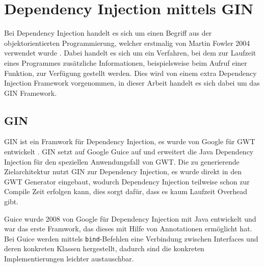 \section{Dependency Injection mittels GIN} \label{GIN}
Bei Dependency Injection handelt es sich um einen Begriff aus der
objektorientierten Programmierung, welcher erstmalig von Martin Fowler 2004
verwendet wurde \cite{bib:DI}. Dabei handelt es sich um
ein Verfahren, bei dem zur Laufzeit eines Programmes zusätzliche Informationen,
beispielsweise beim Aufruf einer Funktion, zur Verfügung gestellt werden. Dies
wird von einem extra Dependency Injection Framework vorgenommen, in dieser
Arbeit handelt es sich dabei um das GIN Framework.

\subsection{GIN}
GIN ist ein Framwork für Dependency Injection, es wurde von Google
für GWT entwickelt \cite[GIN]{bib:gin}. GIN setzt auf Google Guice
\cite[Guice]{bib:guice} auf und erweitert die Java Dependency Injection für den
speziellen Anwendungsfall von GWT. Die zu generierende Zielarchitektur nutzt
GIN zur Dependency Injection, es wurde direkt in den GWT Generator eingebaut,
wodurch Dependency Injection teilweise schon zur Compile Zeit erfolgen kann,
dies sorgt dafür, dass es kaum Laufzeit Overhead gibt.

Guice wurde 2008 von Google für Dependency Injection mit Java entwickelt und war
das erste Framwork, das dieses mit Hilfe von Annotationen
ermöglicht hat. Bei Guice werden mittels \texttt{bind}-Befehlen eine Verbindung
zwischen Interfaces und deren konkreten Klassen hergestellt, dadurch sind die konkreten
Implementierungen leichter austauschbar.
